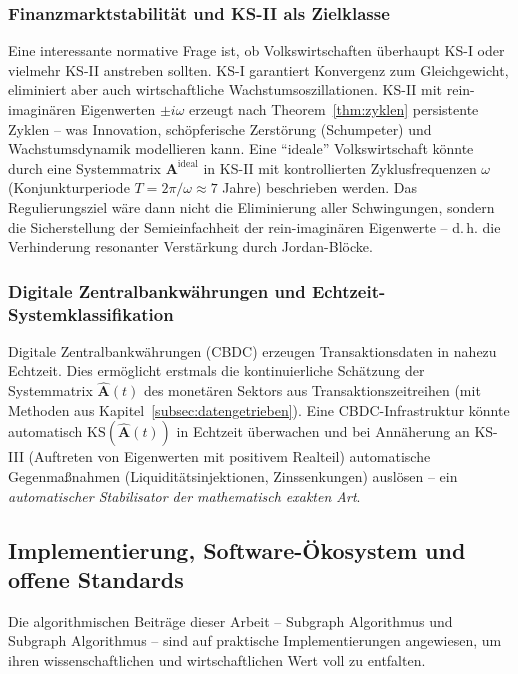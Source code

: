 \documentclass[a4paper, 12pt, twoside, openright]{report}
\theoremstyle{definition}
\theoremstyle{definition}
\newcommand{\vA}{\bm{A}}
\newcommand{\KS}{\mathrm{KS}}
\begin{document}
\subsubsection*{Finanzmarktstabilität und KS-II als Zielklasse}

Eine interessante normative Frage ist, ob Volkswirtschaften überhaupt KS-I oder
vielmehr KS-II anstreben sollten. KS-I garantiert Konvergenz zum Gleichgewicht,
eliminiert aber auch wirtschaftliche Wachstumsoszillationen. KS-II mit
rein-imaginären Eigenwerten $\pm i\omega$ erzeugt nach Theorem~\ref{thm:zyklen}
persistente Zyklen -- was Innovation, schöpferische Zerstörung (Schumpeter)
und Wachstumsdynamik modellieren kann. Eine ``ideale'' Volkswirtschaft könnte
durch eine Systemmatrix $\vA^{\mathrm{ideal}}$ in KS-II mit kontrollierten
Zyklusfrequenzen $\omega$ (Konjunkturperiode $T = 2\pi/\omega \approx 7$ Jahre)
beschrieben werden. Das Regulierungsziel wäre dann nicht die Eliminierung aller
Schwingungen, sondern die Sicherstellung der Semieinfachheit der rein-imaginären
Eigenwerte -- d.\,h. die Verhinderung resonanter Verstärkung durch Jordan-Blöcke.

\subsubsection*{Digitale Zentralbankwährungen und Echtzeit-Systemklassifikation}

Digitale Zentralbankwährungen (CBDC) erzeugen Transaktionsdaten in nahezu
Echtzeit. Dies ermöglicht erstmals die kontinuierliche Schätzung der
Systemmatrix $\hat{\vA}(t)$ des monetären Sektors aus Transaktionszeitreihen
(mit Methoden aus Kapitel~\ref{subsec:datengetrieben}). Eine CBDC-Infrastruktur
könnte automatisch $\KS(\hat{\vA}(t))$ in Echtzeit überwachen und bei
Annäherung an KS-III (Auftreten von Eigen\-werten mit positivem Realteil) automatische
Gegenmaßnahmen (Liquiditäts\-injektionen, Zinssenkungen) auslösen -- ein
\emph{automatischer Stabilisator der mathematisch exakten Art}.

\subsection{Implementierung, Software-Ökosystem und offene Standards}
\label{subsec:software}

Die algorithmischen Beiträge dieser Arbeit -- Subgraph Algorithmus und
Subgraph Algorithmus -- sind auf praktische Implementierungen angewiesen,
um ihren wissenschaftlichen und wirtschaftlichen Wert voll zu entfalten.
\end{document}
